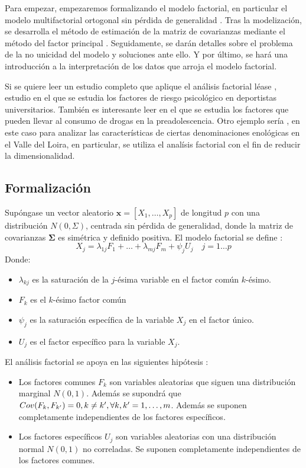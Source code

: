 \noindent Para empezar, empezaremos formalizando el modelo factorial, en particular el modelo multifactorial ortogonal  sin pérdida de generalidad \cite{Johnson 2007}. Tras la modelización, se desarrolla el método de estimación de la matriz de covarianzas  mediante el método del factor principal \cite{Peña 2002}. Seguidamente, se darán detalles sobre el problema de la no unicidad del modelo y soluciones ante ello. Y por último, se hará una introducción a la interpretación de los datos que arroja el modelo factorial. 

\noindent Si se quiere leer un estudio completo que aplique el análisis factorial léase \cite{Galindo 2015}, estudio en el que se estudia los factores de riesgo psicológico en deportistas universitarios.  También es interesante leer \cite{Diez 2002} en el que se estudia los factores que pueden llevar al consumo de drogas en la preadolescencia. Otro ejemplo sería \cite{Pages 2005}, en este caso para analizar las características de ciertas denominaciones  enológicas en el Valle del Loira, en particular, se utiliza el analísis factorial con el fin de reducir la dimensionalidad. 

\subsection{Formalización}
\noindent Supóngase un vector aleatorio $\mathbf{x}= [X_1, \ldots, X_p]$ de longitud $p$ con una distribución $N(0,\Sigma)$, centrada sin pérdida de generalidad, donde la matriz de covarianzas $\mathbf{\Sigma}$ es simétrica y definido positiva. El modelo factorial se define \cite{Chatfield 1989}:  
\begin{equation}\label{eq Fact}
X_j= \lambda_{1j}F_1+\ldots+\lambda_{mj}F_m+\psi_j U_j\quad j=1\ldots p 
\end{equation}
\noindent Donde:
\begin{itemize}
\item $\lambda_{kj}$ es la saturación de la $j$-ésima variable en el factor común $k$-ésimo. 
\item $F_k$ es el $k$-ésimo factor común
\item $\psi_j$ es la saturación  específica de la variable $X_j$ en el factor único. 
\item $U_j$ es el factor específico para la variable $X_j$.
\end{itemize}

\noindent El análisis factorial se apoya en las siguientes hipótesis \cite{Cuadras 2014}:
\begin{itemize}
\item Los factores comunes $F_k$ son variables aleatorias que siguen una distribución marginal $N(0,1)$. Además se supondrá que $Cov(F_k,F_{k'})=0, k\neq k',\\ \forall k,k'=1,\ldots, m$. Además se suponen completamente independientes de los factores específicos. 

\item Los factores específicos $U_j$ son variables aleatorias con una distribución normal $N(0,1)$ no correladas. Se suponen  completamente independientes de los factores comunes. 
\end{itemize}

